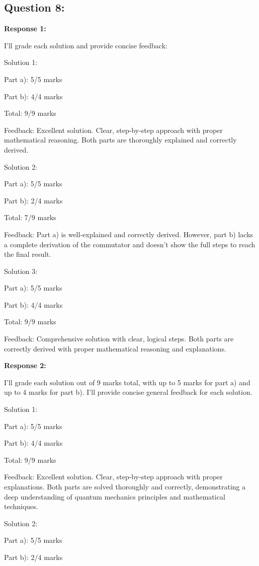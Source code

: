 \documentclass[a4paper,11pt]{article}
\begin{document}
\subsection*{Question 8:}

\textbf{Response 1:}

I'll grade each solution and provide concise feedback:

Solution 1:

Part a): 5/5 marks

Part b): 4/4 marks

Total: 9/9 marks

Feedback: Excellent solution. Clear, step-by-step approach with proper mathematical reasoning. Both parts are thoroughly explained and correctly derived.

Solution 2:

Part a): 5/5 marks

Part b): 2/4 marks

Total: 7/9 marks

Feedback: Part a) is well-explained and correctly derived. However, part b) lacks a complete derivation of the commutator and doesn't show the full steps to reach the final result.

Solution 3:

Part a): 5/5 marks

Part b): 4/4 marks

Total: 9/9 marks

Feedback: Comprehensive solution with clear, logical steps. Both parts are correctly derived with proper mathematical reasoning and explanations.

\bigskip
\textbf{Response 2:}

I'll grade each solution out of 9 marks total, with up to 5 marks for part a) and up to 4 marks for part b). I'll provide concise general feedback for each solution.

Solution 1:

Part a): 5/5 marks

Part b): 4/4 marks

Total: 9/9 marks

Feedback: Excellent solution. Clear, step-by-step approach with proper explanations. Both parts are solved thoroughly and correctly, demonstrating a deep understanding of quantum mechanics principles and mathematical techniques.

Solution 2:

Part a): 5/5 marks

Part b): 2/4 marks
\end{document}
